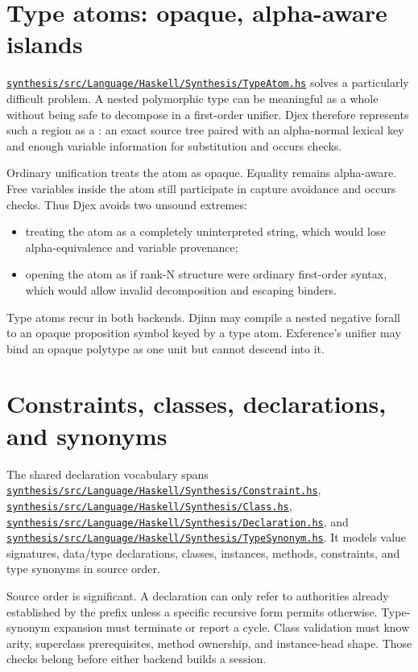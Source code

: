 \documentclass[10pt,letterpaper,oneside]{report}
\newcommand{\code}[1]{\texttt{\detokenize{#1}}}
\def\DjexBase{https://github.com/VladimirReshetnikov/Djex/blob/e454757d53ec057238c22fc6cd0d935b7d96b3dc/}
\newcommand{\dpath}[1]{\href{\DjexBase#1}{\nolinkurl{#1}}}
\begin{document}
\section{Type atoms: opaque, alpha-aware islands}

\dpath{synthesis/src/Language/Haskell/Synthesis/TypeAtom.hs} solves a particularly difficult problem. A nested polymorphic type can be meaningful as a whole without being safe to decompose in a first-order unifier. Djex therefore represents such a region as a \code{TypeAtom}: an exact source tree paired with an alpha-normal lexical key and enough variable information for substitution and occurs checks.

Ordinary unification treats the atom as opaque. Equality remains alpha-aware. Free variables inside the atom still participate in capture avoidance and occurs checks. Thus Djex avoids two unsound extremes:

\begin{itemize}
  \item treating the atom as a completely uninterpreted string, which would lose alpha-equivalence and variable provenance;
  \item opening the atom as if rank-N structure were ordinary first-order syntax, which would allow invalid decomposition and escaping binders.
\end{itemize}

Type atoms recur in both backends. Djinn may compile a nested negative forall to an opaque proposition symbol keyed by a type atom. Exference's unifier may bind an opaque polytype as one unit but cannot descend into it.

\section{Constraints, classes, declarations, and synonyms}

The shared declaration vocabulary spans \dpath{synthesis/src/Language/Haskell/Synthesis/Constraint.hs}, \dpath{synthesis/src/Language/Haskell/Synthesis/Class.hs}, \dpath{synthesis/src/Language/Haskell/Synthesis/Declaration.hs}, and \dpath{synthesis/src/Language/Haskell/Synthesis/TypeSynonym.hs}. It models value signatures, data/type declarations, classes, instances, methods, constraints, and type synonyms in source order.

Source order is significant. A declaration can only refer to authorities already established by the prefix unless a specific recursive form permits otherwise. Type-synonym expansion must terminate or report a cycle. Class validation must know arity, superclass prerequisites, method ownership, and instance-head shape. Those checks belong before either backend builds a session.
\end{document}
